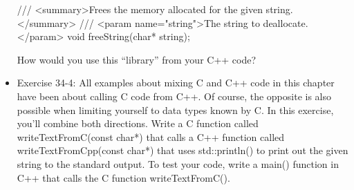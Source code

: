 \begin{itemize}
\begin{cpp}
/// <summary>Frees the memory allocated for the given string.</summary>
/// <param name="string">The string to deallocate.</param>
void freeString(char* string);
\end{cpp}

How would you use this “library” from your C++ code?

\item
Exercise 34-4: All examples about mixing C and C++ code in this chapter have been about calling C code from C++. Of course, the opposite is also possible when limiting yourself to data types known by C. In this exercise, you’ll combine both directions. Write a C function called writeTextFromC(const char*) that calls a C++ function called writeTextFromCpp(const char*) that uses std::println() to print out the given string to the standard output. To test your code, write a main() function in C++ that calls the C function writeTextFromC().
\end{itemize}
